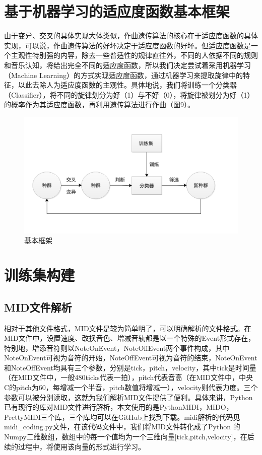 \documentclass[UTF8,a4paper,10pt]{ctexart}
\begin{document}
    \section{\textcolor[rgb]{0,0.3,0.6}{基于机器学习的适应度函数基本框架}}
    由于变异、交叉的具体实现大体类似，作曲遗传算法的核心在于适应度函数的具体实现，可以说，作曲遗传算法的好坏决定于适应度函数的好坏。但适应度函数是一个主观性特别强的内容，除去一些普适性的规律直往外，不同的人依据不同的规则和音乐认知，将给出完全不同的适应度函数，所以我们决定尝试着采用机器学习（Machine Learning）的方式实现适应度函数，通过机器学习来提取旋律中的特征，以此去除人为适应度函数的主观性。具体地说，我们将训练一个分类器（Classifier），将不同的旋律划分为好（1）与不好（0），将旋律被划分为好（1）的概率作为其适应度函数，再利用遗传算法进行作曲（图9）。
    \begin{figure}[H]
    \begin{center}
        \includegraphics[width=0.7\columnwidth]{flow_chart.png}
        \caption{基本框架}
    \end{center}
    \end{figure}

    \section{\textcolor[rgb]{0,0.3,0.6}{训练集构建}}
    \subsection{MID文件解析}
    相对于其他文件格式，MID文件是较为简单明了，可以明确解析的文件格式。在MID文件中，设置速度、改换音色、增减音轨都是以一个特殊的Event形式存在，特别地，增添音符则以NoteOnEvent，NoteOffEvent两个事件构成，其中NoteOnEvent可视为音符的开始，NoteOffEvent可视为音符的结束，NoteOnEvent和NoteOffEvent均具有三个参数，分别是tick，pitch，velocity，其中tick是时间量（在MID文件中，一般480ticks代表一拍），pitch代表音高（在MID文件中，中央C的pitch为60，每增减一个半音，pitch数值将增减一），velocity则代表力度。三个参数可以被分别读取，这就为我们解析MID文件提供了便利。具体来讲，Python已有现行的库对MID文件进行解析，本文使用的是PythonMIDI，MIDO，PrettyMIDI三个库，三个库均可以在GitHub上找到下载。midi解析的代码见midi\_coding.py文件，在该代码文件中，我们将MID文件转化成了Python 的Numpy二维数组，数组中的每一个值均为一个三维向量[tick,pitch,velocity]，在后续的过程中，将使用该向量的形式进行学习。
\end{document}
